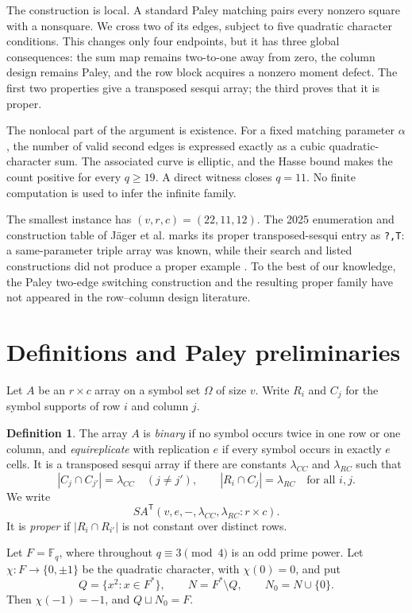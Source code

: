 \documentclass[11pt]{article}
\theoremstyle{definition}
\newtheorem{definition}[theorem]{Definition}
\theoremstyle{remark}
\newcommand{\F}{\mathbb F}
\newcommand{\SA}{SA^{\mathsf T}}
\begin{document}
The construction is local.  A standard Paley matching pairs every nonzero
square with a nonsquare.  We cross two of its edges, subject to five quadratic
character conditions.  This changes only four endpoints, but it has three
global consequences: the sum map remains two-to-one away from zero, the
column design remains Paley, and the row block acquires a nonzero moment
defect.  The first two properties give a transposed sesqui array; the third
proves that it is proper.

The nonlocal part of the argument is existence.  For a fixed matching
parameter \(\alpha\), the number of valid second edges is expressed exactly as
a cubic quadratic-character sum.  The associated curve is elliptic, and the
Hasse bound makes the count positive for every \(q\geq19\).  A direct witness
closes \(q=11\).  No finite computation is used to infer the infinite family.

The smallest instance has \((v,r,c)=(22,11,12)\).  The 2025 enumeration and
construction table of J\"ager et al. marks its proper transposed-sesqui entry
as \texttt{?,T}: a same-parameter triple array was known, while their search
and listed constructions did not produce a proper example
\cite[Table~2]{jager-enumeration}.  To the best of our knowledge, the Paley
two-edge switching construction and the resulting proper family have not
appeared in the row--column design literature.

\section{Definitions and Paley preliminaries}
Let \(A\) be an \(r\times c\) array on a symbol set \(\Omega\) of size \(v\).
Write \(R_i\) and \(C_j\) for the symbol supports of row \(i\) and column
\(j\).

\begin{definition}
The array \(A\) is \emph{binary} if no symbol occurs twice in one row or one
column, and \emph{equireplicate} with replication \(e\) if every symbol occurs
in exactly \(e\) cells.  It is a transposed sesqui array if there are constants
\(\lambda_{CC}\) and \(\lambda_{RC}\) such that
\[
 |C_j\cap C_{j'}|=\lambda_{CC}\quad(j\ne j'),
 \qquad
 |R_i\cap C_j|=\lambda_{RC}\quad\text{for all }i,j.
\]
We write
\[
 \SA(v,e,-,\lambda_{CC},\lambda_{RC}:r\times c).
\]
It is \emph{proper} if \(|R_i\cap R_{i'}|\) is not constant over distinct
rows.
\end{definition}

Let \(F=\F_q\), where throughout \(q\equiv3\pmod4\) is an odd prime power.
Let \(\chi:F\to\{0,\pm1\}\) be the quadratic character, with \(\chi(0)=0\),
and put
\[
 Q=\{x^2:x\in F^*\},\qquad N=F^*\setminus Q,
 \qquad N_0=N\cup\{0\}.
\]
Then \(\chi(-1)=-1\), and \(Q\sqcup N_0=F\).
\end{document}
